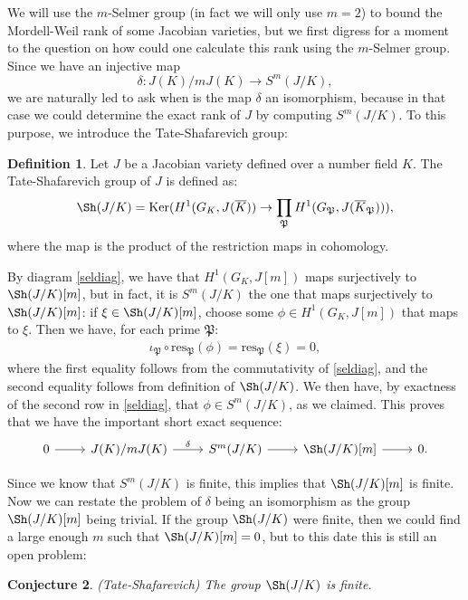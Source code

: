 \documentclass[a4paper, 12pt]{amsart}
\theoremstyle{definition}
\newtheorem{defn0}{Definition}[section]
\theoremstyle{plain}
\theoremstyle{plain}
\theoremstyle{plain}
\theoremstyle{plain}
\theoremstyle{remark}
\theoremstyle{remark}
\theoremstyle{plain}
\newtheorem{conjecture0}[defn0]{Conjecture}
\newenvironment{definition}{ \begin{defn0}}{\end{defn0}}
\newenvironment{conjecture}{\begin{conjecture0}}{\end{conjecture0}}
\renewcommand{\P}{\mathfrak{P}}
\DeclareMathOperator{\Ker}{Ker}
\begin{document}
	We will use the $m$-Selmer group (in fact we will only use $m=2$) to bound the Mordell-Weil rank of some Jacobian varieties, but we first digress for a moment to the question on how could one calculate this rank using the $m$-Selmer group. Since we have an injective map
	\begin{equation*}
		\delta:J(K)/mJ(K)\rightarrow S^m(J/K),
	\end{equation*}
	we are naturally led to ask when is the map $\delta$ an isomorphism, because in that case we could determine the exact rank of $J$ by computing $S^m(J/K)$. To this purpose, we introduce the Tate-Shafarevich group:
	\begin{definition}
		Let $J$ be a Jacobian variety defined over a number field $K$. The Tate-Shafarevich group of $J$ is defined as:
		\begin{equation*}
			\Sh(J/K)=\Ker(H^1(G_K,J(\overline{K}))\rightarrow \prod_\P H^1(G_\P,J(\overline{K}_\P))),
		\end{equation*}
		where the map is the product of the restriction maps in cohomology.
	\end{definition}
	
	By diagram \eqref{seldiag}, we have that $H^1(G_K,J[m])$ maps surjectively to $\Sh(J/K)[m]$, but in fact, it is $S^m(J/K)$ the one that maps surjectively to $\Sh(J/K)[m]$: if $\xi\in\Sh(J/K)[m]$, choose some $\phi\in H^1(G_K,J[m])$ that maps to $\xi$. Then we have, for each prime $\P$:
	\begin{align*}
		\iota_\P\circ\text{res}_\P(\phi)=\text{res}_\P(\xi)=0,
	\end{align*}
	where the first equality follows from the commutativity of \eqref{seldiag}, and the second equality follows from definition of $\Sh(J/K)$. We then have, by exactness of the second row in \eqref{seldiag}, that $\phi\in S^m(J/K)$, as we claimed. This proves that we have the important short exact sequence:
	\begin{equation*}
		\begin{tikzcd}
			0\arrow{r}
			&J(K)/mJ(K)\arrow{r}{\delta}
			&S^m(J/K)\arrow{r}
			&\Sh(J/K)[m]\arrow{r}
			&0.
		\end{tikzcd}
	\end{equation*}
	
	Since we know that $S^m(J/K)$ is finite, this implies that $\Sh(J/K)[m]$ is finite. Now we can restate the problem of $\delta$ being an isomorphism as the group $\Sh(J/K)[m]$ being trivial. If the group $\Sh(J/K)$ were finite, then we could find a large enough $m$ such that $\Sh(J/K)[m]=0$, but to this date this is still an open problem:
	\begin{conjecture}(Tate-Shafarevich)
		The group $\Sh(J/K)$ is finite.
	\end{conjecture}
	
\end{document}
